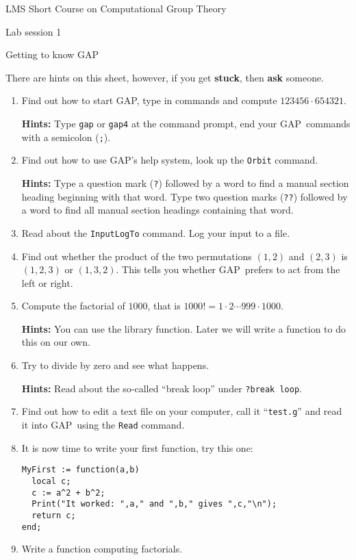 \documentclass[12pt]{article}
\newcommand{\GAP}{\textsf{GAP}}
\begin{document}
\begin{center}
\large LMS Short Course on Computational Group Theory

\Large Lab session 1

\large Getting to know \GAP
\end{center}

There are hints on this sheet, however, if you get \textbf{stuck}, then
\textbf{ask} someone.

\begin{enumerate}
\setlength{\parskip}{0pt}
\item Find out how to start \GAP, type in commands and compute
$123456 \cdot 654321$.

\textbf{Hints:} Type \texttt{gap} or \texttt{gap4} at the command prompt,
end your \GAP\ commands with a semicolon (\texttt{;}).

\item Find out how to use \GAP's help system, look up the \texttt{Orbit}
command.

\textbf{Hints:} Type a question mark (\texttt{?}) followed by a word
to find a manual section heading beginning with that word. Type two
question marks (\texttt{??}) followed by a word to find all manual
section headings containing that word.

\item Read about the \texttt{InputLogTo} command. Log your input to a file.
\item Find out whether the product of the two permutations $(1,2)$ and
$(2,3)$ is $(1,2,3)$ or $(1,3,2)$. This tells you whether \GAP\ prefers
to act from the left or right.

\item Compute the factorial of $1000$, that is $1000! = 1 \cdot 2 \cdots
999 \cdot 1000$.

\textbf{Hints:} You can use the library function. Later we will write
a function to do this on our own.
\item Try to divide by zero and see what happens.

\textbf{Hints:} Read about the so-called ``break loop'' under
\texttt{?break loop}. 
\item Find out how to edit a text file on your computer, call it
``\texttt{test.g}'' and read it into \GAP\ using the \texttt{Read} command.
\item It is now time to write your first function, try this one:
{\small \begin{verbatim}
MyFirst := function(a,b)
  local c;
  c := a^2 + b^2;
  Print("It worked: ",a," and ",b," gives ",c,"\n");
  return c;
end;
\end{verbatim}}
\item Write a function computing factorials.


\end{enumerate}
\end{document}
